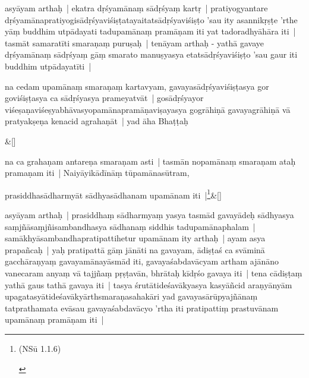\documentclass[article,12pt,a4paper]{memoir}
\begin{document}
	  \pstart asyāyam arthaḥ | ekatra dṛśyamānaṃ sādṛśyaṃ kartṛ | pratiyogyantare dṛśyamānapratiyogisādṛśyaviśiṣṭatayaitatsādṛśyaviśiṣṭo 'sau ity asannikṛṣṭe 'rthe yāṃ buddhim utpādayati tadupamānaṃ pramāṇam iti yat tadoradhyāhāra iti |\label{kāśikā1_end} tasmāt samaratīti smaraṇaṃ puruṣaḥ | tenāyam arthaḥ - yathā gavaye dṛśyamānaṃ sādṛśyaṃ gāṃ smarato manuṣyasya etatsādṛśyaviśiṣṭo 'sau gaur iti buddhim utpādayatīti |
	\pend
      

	  \pstart na cedam upamānaṃ smaraṇaṃ kartavyam, gavayasādṛśyaviśiṣṭasya gor goviśiṣṭasya ca sādṛśyasya prameyatvāt | gosādṛśyayor viśeṣaṇaviśeṣyabhāvasyopamānapramāṇaviṣayasya gogrāhiṇā gavayagrāhiṇā vā pratyakṣeṇa kenacid agrahaṇāt | yad āha Bhaṭṭaḥ
	\pend
      
	    
	    \stanza[\smallbreak]
	\&[\smallbreak]


	

	  \pstart na ca grahaṇam antareṇa smaraṇam asti | tasmān nopamānaṃ smaraṇam ataḥ pramaṇam iti | Naiyāyikādīnāṃ tūpamānasūtram,
	\pend
      
	    
	    \stanza[\smallbreak]
	prasiddhasādharmyāt sādhyasādhanam upamānam iti |\footnote{\begin{english}(NSū 1.1.6)\end{english}}\&[\smallbreak]


	

	  \pstart asyāyam arthaḥ | prasiddhaṃ sādharmyaṃ yasya tasmād gavayādeḥ sādhyasya saṃjñāsaṃjñisambandhasya sādhanaṃ siddhis tadupamānaphalam | samākhyāsambandhapratipattihetur upamānam ity arthaḥ | ayam asya prapañcaḥ | yaḥ pratipattā gāṃ jānāti na gavayam, ādiṣṭaś ca svāminā gacchāraṇyaṃ gavayamānayāsmād iti, gavayaśabdavācyam artham ajānāno vanecaram anyaṃ vā tajjñaṃ pṛṣṭavān, bhrātaḥ kīdṛśo gavaya iti | tena cādiṣṭaṃ yathā gaus tathā gavaya iti | tasya śrutātideśavākyasya kasyāñcid araṇyānyām upagatasyātideśavākyārthsmaraṇasahakāri yad gavayasārūpyajñānaṃ tatprathamata evāsau gavayaśabdavācyo 'rtha iti pratipattiṃ prastuvānam upamānaṃ pramāṇam iti |
	\pend
      
\end{document}
